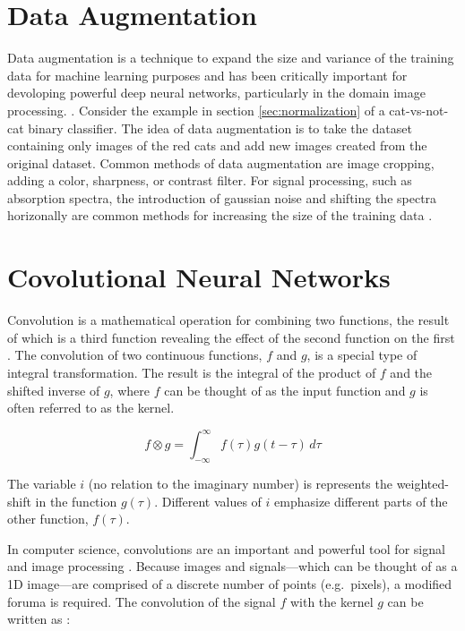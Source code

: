 \section{Data Augmentation}
Data augmentation is a technique to expand the size and variance of the training data for machine learning purposes and has been critically important for devoloping powerful deep neural networks, particularly in the domain image processing. \cite{data-augmentation1}\cite{data-augmentation2} \cite{data-augmentation3} \cite{data-augmentation4}. Consider the example in section \ref{sec:normalization} of a cat-vs-not-cat binary classifier. The idea of data augmentation is to take the dataset containing only images of the red cats and add new images created from the original dataset. Common methods of data augmentation are image cropping, adding a color, sharpness, or contrast filter. For signal processing, such as absorption spectra, the introduction of gaussian noise and shifting the spectra horizonally are common methods for increasing the size of the training data \cite{data-augmentation5}.

\section{Covolutional Neural Networks}
Convolution is a mathematical operation for combining two functions, the result of which is a third function revealing the effect of the second function on the first \cite{Boas-mathmethods}. The convolution of two continuous functions, $ f $ and $ g $, is a special type of integral transformation. The result is the integral of the product of $ f $ and the shifted inverse of $ g $, where $ f $ can be thought of as the input function and $ g $ is often referred to as the kernel.

\begin{equation}
    f \otimes g = \int_{-\infty}^{\infty} f(\tau)g(t-\tau) \,d\tau 
\end{equation}

\noindent The variable $ i $ (no relation to the imaginary number) is represents the weighted-shift in the function $ g(\tau) $. Different values of $ i $ emphasize different parts of the other function, $ f(\tau) $.  

In computer science, convolutions are an important and powerful tool for signal and image processing \cite{1dconv-NN-survey} \cite{deepCNNforImages}. Because images and signals---which can be thought of as a 1D image---are comprised of a discrete number of points (e.g.~pixels), a modified foruma is required. The convolution of the signal $ f $ with the kernel $ g $ can be written as \cite{cornell-convs}:

